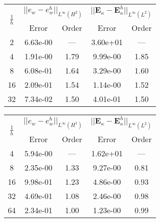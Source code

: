 \begin{table}[hp]
	\centering
	\begin{tabular}{ccccc}
		\hline 
		\multirow{2}{*}{$\frac{1}{h}$} & \multicolumn{2}{c}{$||e_w - e_w^h||_{L^{\infty}(H^2)}$}  & \multicolumn{2}{c}{$||\bm{E}_\kappa - \bm{E}_\kappa^h||_{L^{\infty}(L^2)}$}   \\ 
		& Error & Order  & Error & Order  \\
		\hline 
		2  & 6.63e-00 & ---  & 3.60e+01 & ---  \\ 
		4  & 1.91e-00 & 1.79 & 9.99e-00 & 1.85 \\ 
		8  & 6.08e-01 & 1.64 & 3.29e-00 & 1.60 \\ 
		16 & 2.09e-01 & 1.54 & 1.14e-00 & 1.52 \\ 
		32 & 7.34e-02 & 1.50 & 4.01e-01 & 1.50 \\ 
		\hline 
	\end{tabular} 
	\captionsetup{width=0.95\linewidth}
	\vspace{1mm}
	\label{tab:reskirBellDG3_SSSS}
\end{table}


\begin{table}[hp]
	\centering
	\begin{tabular}{ccccc}
		\hline 
		\multirow{2}{*}{$\frac{1}{h}$} & \multicolumn{2}{c}{$||e_w - e_w^h||_{L^{\infty}(H^1)}$}  & \multicolumn{2}{c}{$||\bm{E}_\kappa - \bm{E}_\kappa^h||_{L^{\infty}(L^2)}$}   \\ 
		& Error & Order  & Error & Order  \\
		\hline 
		4  & 5.94e-00 & ---  & 1.62e+01 & ---  \\ 
		8  & 2.35e-00 & 1.33 & 9.27e-00 & 0.81 \\ 
		16 & 9.98e-01 & 1.23 & 4.86e-00 & 0.93 \\ 
		32 & 4.69e-01 & 1.08 & 2.46e-00 & 0.98 \\ 
		64 & 2.34e-01 & 1.00 & 1.23e-00 & 0.99 \\ 
		\hline 
	\end{tabular} 
	\captionsetup{width=0.95\linewidth}
	\vspace{1mm}
	\label{tab:reskirHHJ_CSFS_k1}
\end{table}

